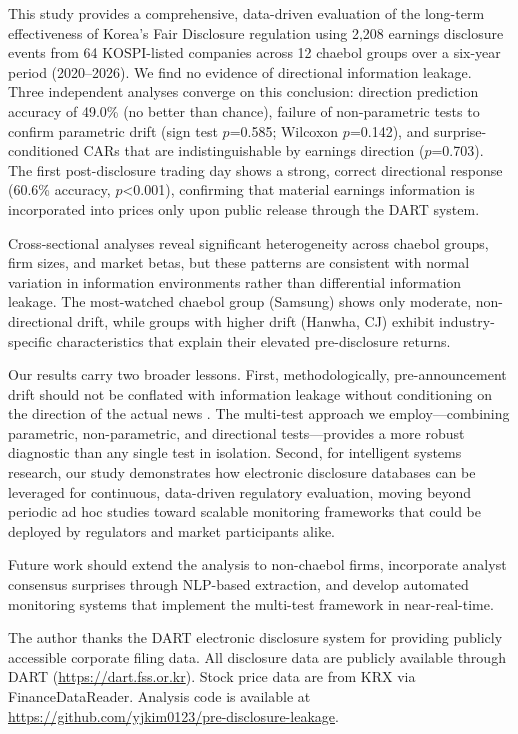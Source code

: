\documentclass[manuscript,review]{acmart}
\begin{document}
This study provides a comprehensive, data-driven evaluation of the long-term effectiveness of Korea's Fair Disclosure regulation using 2,208 earnings disclosure events from 64 KOSPI-listed companies across 12 chaebol groups over a six-year period (2020--2026). We find no evidence of directional information leakage. Three independent analyses converge on this conclusion: direction prediction accuracy of 49.0\% (no better than chance), failure of non-parametric tests to confirm parametric drift (sign test $p$=0.585; Wilcoxon $p$=0.142), and surprise-conditioned CARs that are indistinguishable by earnings direction ($p$=0.703). The first post-disclosure trading day shows a strong, correct directional response (60.6\% accuracy, $p$<0.001), confirming that material earnings information is incorporated into prices only upon public release through the DART system.

Cross-sectional analyses reveal significant heterogeneity across chaebol groups, firm sizes, and market betas, but these patterns are consistent with normal variation in information environments rather than differential information leakage. The most-watched chaebol group (Samsung) shows only moderate, non-directional drift, while groups with higher drift (Hanwha, CJ) exhibit industry-specific characteristics that explain their elevated pre-disclosure returns.

Our results carry two broader lessons. First, methodologically, pre-announcement drift should not be conflated with information leakage without conditioning on the direction of the actual news \cite{meulbroek1992comparison, bernile2016can, atiase1985predisclosure}. The multi-test approach we employ---combining parametric, non-parametric, and directional tests---provides a more robust diagnostic than any single test in isolation. Second, for intelligent systems research, our study demonstrates how electronic disclosure databases can be leveraged for continuous, data-driven regulatory evaluation, moving beyond periodic ad hoc studies toward scalable monitoring frameworks that could be deployed by regulators and market participants alike.

Future work should extend the analysis to non-chaebol firms, incorporate analyst consensus surprises through NLP-based extraction, and develop automated monitoring systems that implement the multi-test framework in near-real-time.

\begin{acks}
The author thanks the DART electronic disclosure system for providing publicly accessible corporate filing data. All disclosure data are publicly available through DART (\url{https://dart.fss.or.kr}). Stock price data are from KRX via FinanceDataReader. Analysis code is available at \url{https://github.com/yjkim0123/pre-disclosure-leakage}.
\end{acks}



\end{document}
